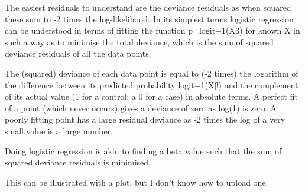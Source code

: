 
The easiest residuals to understand are the deviance residuals as when squared these sum to -2 times the log-likelihood. In its simplest terms logistic regression can be understood in terms of fitting the function p=logit−1(Xβ) for known X in such a way as to minimise the total deviance, which is the sum of squared deviance residuals of all the data points.

The (squared) deviance of each data point is equal to (-2 times) the logarithm of the difference between its predicted probability logit−1(Xβ) and the complement of its actual value (1 for a control; a 0 for a case) in absolute terms. A perfect fit of a point (which never occurs) gives a deviance of zero as log(1) is zero. A poorly fitting point has a large residual deviance as -2 times the log of a very small value is a large number.

Doing logistic regression is akin to finding a beta value such that the sum of squared deviance residuals is minimised.

This can be illustrated with a plot, but I don't know how to upload one.
